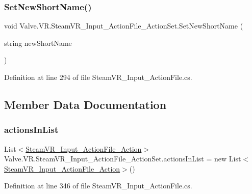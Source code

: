\subsubsection{\texorpdfstring{SetNewShortName()}{SetNewShortName()}}
{\footnotesize\ttfamily void Valve.\+V\+R.\+Steam\+V\+R\+\_\+\+Input\+\_\+\+Action\+File\+\_\+\+Action\+Set.\+Set\+New\+Short\+Name (\begin{DoxyParamCaption}\item[{string}]{new\+Short\+Name }\end{DoxyParamCaption})}



Definition at line 294 of file Steam\+V\+R\+\_\+\+Input\+\_\+\+Action\+File.\+cs.



\subsection{Member Data Documentation}
\mbox{\label{class_valve_1_1_v_r_1_1_steam_v_r___input___action_file___action_set_a711c009f1077a71af8b5c2d23750c9e9}} 
\subsubsection{\texorpdfstring{actionsInList}{actionsInList}}
{\footnotesize\ttfamily List$<$\mbox{\hyperlink{class_valve_1_1_v_r_1_1_steam_v_r___input___action_file___action}{Steam\+V\+R\+\_\+\+Input\+\_\+\+Action\+File\+\_\+\+Action}}$>$ Valve.\+V\+R.\+Steam\+V\+R\+\_\+\+Input\+\_\+\+Action\+File\+\_\+\+Action\+Set.\+actions\+In\+List = new List$<$\mbox{\hyperlink{class_valve_1_1_v_r_1_1_steam_v_r___input___action_file___action}{Steam\+V\+R\+\_\+\+Input\+\_\+\+Action\+File\+\_\+\+Action}}$>$()}



Definition at line 346 of file Steam\+V\+R\+\_\+\+Input\+\_\+\+Action\+File.\+cs.

\mbox{\label{class_valve_1_1_v_r_1_1_steam_v_r___input___action_file___action_set_a83c1dfb62684c0f77455e2f82f4d3dba}} 
